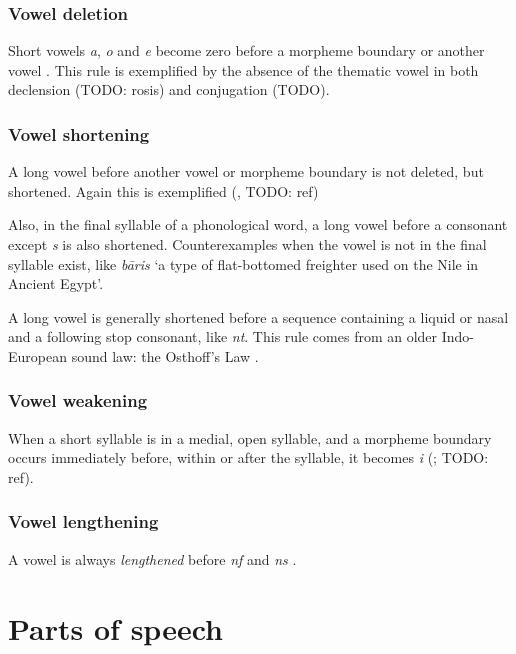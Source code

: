 \documentclass[a4paper, oneside]{report}
\newcommand*{\citesec}[1]{\S~{#1}}
\newcommand*{\citepage}[1]{p.~{#1}}
\newcommand{\form}[1]{\emph{#1}}
\newcommand{\translate}[1]{`#1'}
\begin{document}
\subsection{Vowel deletion}\label{sec:phonology.rule.deletion}

Short vowels \form{a}, \form{o} and \form{e} 
become zero before a morpheme boundary or another vowel
\citep[\citesec{8.3}]{oniga2014latin}.
This rule is exemplified by the absence 
of the thematic vowel in both declension (TODO: rosis)
and conjugation (TODO).

\subsection{Vowel shortening}\label{sec:phonology.rule.shortening}

A long vowel before another vowel or morpheme boundary 
is not deleted, but shortened.
Again this is exemplified (, TODO: ref)

Also, in the final syllable of a phonological word,
a long vowel before a consonant except \form{s} is also shortened.
Counterexamples when the vowel is not in the final syllable exist,
like \form{b\={a}ris} \translate{a type of flat-bottomed freighter used on the Nile in Ancient Egypt}.

A long vowel is generally shortened before a sequence 
containing a liquid or nasal and a following stop consonant,
like \form{nt}.
This rule comes from an older Indo-European sound law: 
the Osthoff's Law
\citep[\citepage{55}]{oniga2014latin}.

\subsection{Vowel weakening}

When a short syllable is in a medial, open syllable,
and a morpheme boundary occurs immediately before, within or after the syllable,
it becomes \form{i} 
(\citealt[\citepage{55}]{oniga2014latin}; TODO: ref).

\subsection{Vowel lengthening}

A vowel is always \emph{lengthened} before \form{nf} and \form{ns}
\citep[\citepage{55}]{oniga2014latin}.

\chapter{Parts of speech}\label{chap:pos}
\end{document}
